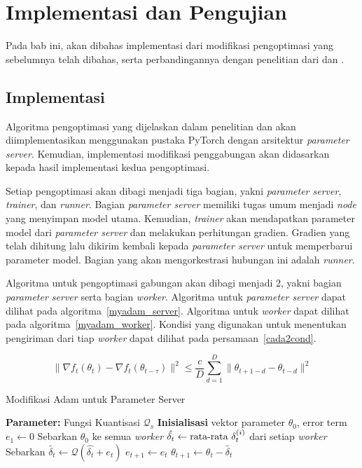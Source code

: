 \chapter{Implementasi dan Pengujian}

Pada bab ini, akan dibahas implementasi dari modifikasi pengoptimasi yang sebelumnya telah dibahas, serta perbandingannya dengan penelitian dari \textcite{Chen2022Efficient} dan \textcite{Chen2021CADA}.

\section{Implementasi}
Algoritma pengoptimasi yang dijelaskan dalam penelitian \textcite{Chen2022Efficient} dan \textcite{Chen2021CADA} akan diimplementasikan menggunakan pustaka PyTorch dengan arsitektur \emph{parameter server}. Kemudian, implementasi modifikasi penggabungan akan didasarkan kepada hasil implementasi kedua pengoptimasi.

Setiap pengoptimasi akan dibagi menjadi tiga bagian, yakni \emph{parameter server}, \emph{trainer}, dan \emph{runner}. Bagian \emph{parameter server} memiliki tugas umum menjadi \emph{node} yang menyimpan model utama. Kemudian, \emph{trainer} akan mendapatkan parameter model dari \emph{parameter server} dan melakukan perhitungan gradien. Gradien yang telah dihitung lalu dikirim kembali kepada \emph{parameter server} untuk memperbarui parameter model. Bagian yang akan mengorkestrasi hubungan ini adalah \emph{runner}.

Algoritma untuk pengoptimasi gabungan akan dibagi menjadi 2, yakni bagian \textit{parameter server} serta bagian \textit{worker}. Algoritma untuk \textit{parameter server} dapat dilihat pada algoritma~\ref{myadam_server}. Algoritma untuk \textit{worker} dapat dilihat pada algoritma~\ref{myadam_worker}. Kondisi yang digunakan untuk menentukan pengiriman dari tiap \textit{worker} dapat dilihat pada persamaan~\ref{cada2cond}.

\begin{equation}[ht]
  \label{cada2cond}
  \|\nabla f_t(\theta_t) - \nabla f_t(\theta_{t-\tau})\|^2 \leq \frac{c}{D} \sum_{d=1}^{D} \|\theta_{t+1-d} - \theta_{t-d}\|^2
\end{equation}

\begin{algorithm}[ht]
  \caption{Modifikasi Adam untuk Parameter Server}\label{myadam_server}
  \begin{algorithmic}[1]
    \State \textbf{Parameter:} Fungsi Kuantisasi $\mathcal{Q}_s$
    \State \textbf{Inisialisasi} vektor parameter $\theta_0$, error term $e_1 \gets 0$
    \State Sebarkan $\theta_0$ ke semua \textit{worker}
    \State $\hat{\delta_t} \gets \textnormal{rata-rata } \delta_t^{(i)}$ dari setiap \textit{worker}
    \State Sebarkan $\tilde{\delta_t} \gets \mathcal{Q}(\hat{\delta_t} + e_t)$
    \State $e_{t+1} \gets e_{t}$
    \State $\theta_{t+1} \gets \theta_t - \tilde{\delta_t}$
    \EndFor
  \end{algorithmic}
\end{algorithm}


